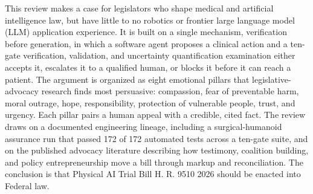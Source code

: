 This review makes a case for legislators who shape medical and
artificial intelligence law, but have little to no robotics or frontier large language model (LLM) application experience. It is built
on a single mechanism, verification before generation, in which a software agent
proposes a clinical action and a ten-gate verification, validation, and
uncertainty quantification examination either accepts it, escalates it to a
qualified human, or blocks it before it can reach a patient. The argument is
organized as eight emotional pillars that legislative-advocacy research finds most
persuasive: compassion, fear of preventable harm, moral outrage, hope,
responsibility, protection of vulnerable people, trust, and urgency. Each pillar
pairs a human appeal with a credible, cited fact. The review draws on a documented engineering lineage,
including a surgical-humanoid assurance run that passed 172 of 172 automated tests
across a ten-gate suite, and on the published advocacy literature describing how
testimony, coalition building, and policy entrepreneurship move a bill through
markup and reconciliation. The conclusion is that Physical
AI Trial Bill H. R. 9510 2026 should be enacted into Federal law.
